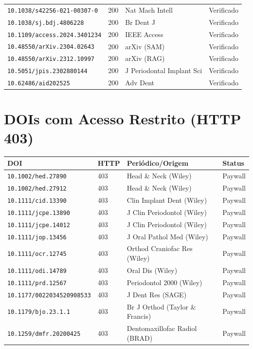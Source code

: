 \begin{longtable}{|p{3.5cm}|p{2cm}|p{6.5cm}|p{2cm}|}
\verb|10.1038/s42256-021-00307-0| & 200 & Nat Mach Intell & Verificado \\
\verb|10.1038/sj.bdj.4806228| & 200 & Br Dent J & Verificado \\
\verb|10.1109/access.2024.3401234| & 200 & IEEE Access & Verificado \\
\verb|10.48550/arXiv.2304.02643| & 200 & arXiv (SAM) & Verificado \\
\verb|10.48550/arXiv.2312.10997| & 200 & arXiv (RAG) & Verificado \\
\verb|10.5051/jpis.2302880144| & 200 & J Periodontal Implant Sci & Verificado \\
\verb|10.62486/aid202525| & 200 & Adv Dent & Verificado \\
\hline
\end{longtable}

\section{DOIs com Acesso Restrito (HTTP 403)}

\begin{longtable}{|p{3.5cm}|p{2cm}|p{6.5cm}|p{2cm}|}
\hline
\textbf{DOI} & \textbf{HTTP} & \textbf{Periódico/Origem} & \textbf{Status} \\
\hline
\endhead
\hline
\endfoot
\verb|10.1002/hed.27890| & 403 & Head \& Neck (Wiley) & Paywall \\
\verb|10.1002/hed.27912| & 403 & Head \& Neck (Wiley) & Paywall \\
\verb|10.1111/cid.13390| & 403 & Clin Implant Dent (Wiley) & Paywall \\
\verb|10.1111/jcpe.13890| & 403 & J Clin Periodontol (Wiley) & Paywall \\
\verb|10.1111/jcpe.14012| & 403 & J Clin Periodontol (Wiley) & Paywall \\
\verb|10.1111/jop.13456| & 403 & J Oral Pathol Med (Wiley) & Paywall \\
\verb|10.1111/ocr.12745| & 403 & Orthod Craniofac Res (Wiley) & Paywall \\
\verb|10.1111/odi.14789| & 403 & Oral Dis (Wiley) & Paywall \\
\verb|10.1111/prd.12567| & 403 & Periodontol 2000 (Wiley) & Paywall \\
\verb|10.1177/0022034520908533| & 403 & J Dent Res (SAGE) & Paywall \\
\verb|10.1179/bjo.23.1.1| & 403 & Br J Orthod (Taylor \& Francis) & Paywall \\
\verb|10.1259/dmfr.20200425| & 403 & Dentomaxillofac Radiol (BRAD) & Paywall \\
\hline
\end{longtable}

